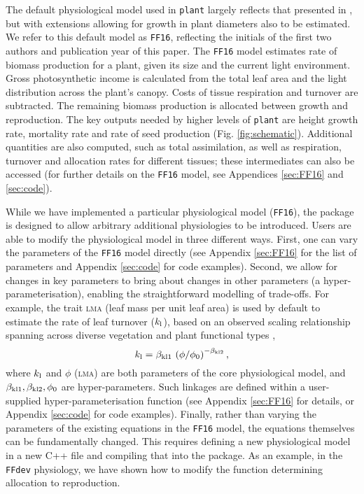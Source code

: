 \documentclass[a4paper,11pt]{article}
\newcommand{\plant}{\texttt{plant}}
\begin{document}
The default physiological model used in {\plant} largely reflects
that presented in \citet{Falster-2011, Falster-2015}, but with extensions
allowing for growth in plant diameters also to be estimated. We refer to this
default model as \texttt{FF16}, reflecting the initials of the first two authors
and publication year of this paper. The \texttt{FF16} model estimates rate
of biomass
production for a plant, given its size and the current light
environment. Gross photosynthetic income is calculated from the total
leaf area and the light distribution across the plant's canopy. Costs
of tissue respiration and turnover are subtracted. The remaining
biomass production is allocated between growth and reproduction. The key
outputs needed by higher levels of {\plant} are height
growth rate, mortality rate and rate of seed production (Fig. \ref{fig:schematic}). Additional quantities are also computed, such as total assimilation, as well as
respiration, turnover and allocation rates for different
tissues; these intermediates can also be accessed (for further details on the \texttt{FF16} model, see Appendices
\ref{sec:FF16} and \ref{sec:code}).

While we have implemented a particular physiological model
(\texttt{FF16}), the package is designed to allow arbitrary
additional physiologies to be introduced. Users are able to modify the
physiological model in three different ways. First, one can vary the
parameters of the \texttt{FF16} model directly (see Appendix
\ref{sec:FF16} for the list of parameters and Appendix \ref{sec:code} for code
examples). Second, we allow for changes in key parameters to bring
about changes in other parameters (a hyper-parameterisation), enabling the
straightforward modelling of trade-offs. For example, the
trait \textsc{lma} (leaf mass per unit leaf area) is used by default to estimate
the rate of leaf turnover ($k_{\rm l}$), based on an observed scaling
relationship spanning across diverse vegetation and plant functional
types \citep{Wright-2004},
$$k_{\rm l} = \beta_{{\rm kl}1} \, \left(\phi / \phi_0\right)^{-\beta_{{\rm kl}2}},$$
where $k_{\rm l}$ and $\phi$ (\textsc{lma}) are both parameters of the core physiological
model, and $\beta_{{\rm kl}1}, \beta_{{\rm kl}2}, \phi_0$ are hyper-parameters. Such
linkages are defined within a user-supplied hyper-parameterisation function
(see Appendix \ref{sec:FF16} for details, or Appendix
\ref{sec:code} for code examples).
%
Finally, rather than varying the parameters of the existing equations
in the \texttt{FF16} model, the equations themselves can be
fundamentally changed. This requires defining a new physiological
model in a new C++ file and compiling that into the package. As an
example, in the \texttt{FFdev} physiology, we have shown how to modify the
function determining allocation to reproduction.
\end{document}

